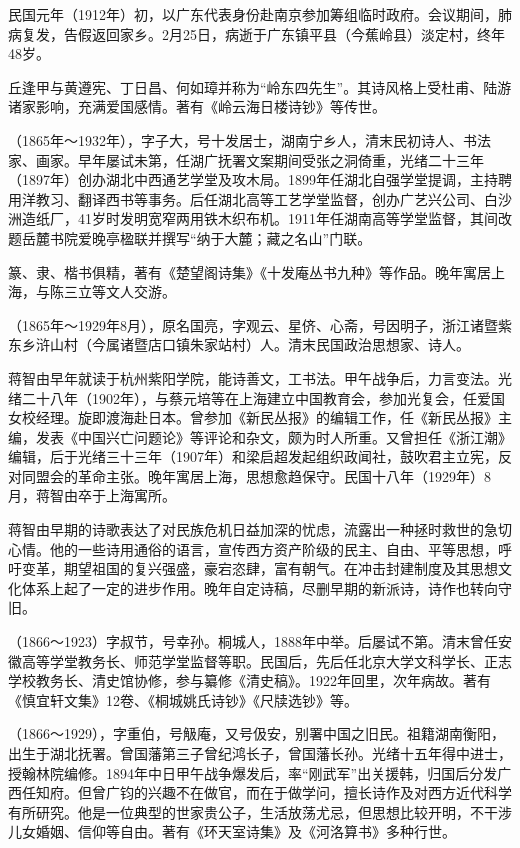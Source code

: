 \begin{description}
        民国元年（1912年）初，以广东代表身份赴南京参加筹组临时政府。会议期间，肺病复发，告假返回家乡。2月25日，病逝于广东镇平县（今蕉岭县）淡定村，终年48岁。\par
        丘逢甲与黄遵宪、丁日昌、何如璋并称为“岭东四先生”。其诗风格上受杜甫、陆游诸家影响，充满爱国感情。著有《岭云海日楼诗钞》等传世。
  \item[程颂万] （1865年～1932年），字子大，号十发居士，湖南宁乡人，清末民初诗人、书法家、画家。早年屡试未第，任湖广抚署文案期间受张之洞倚重，光绪二十三年（1897年）创办湖北中西通艺学堂及攻木局。1899年任湖北自强学堂提调，主持聘用洋教习、翻译西书等事务。后任湖北高等工艺学堂监督，创办广艺兴公司、白沙洲造纸厂，41岁时发明宽窄两用铁木织布机。1911年任湖南高等学堂监督，其间改题岳麓书院爱晚亭楹联并撰写“纳于大麓；藏之名山”门联。\par
        篆、隶、楷书俱精，著有《楚望阁诗集》《十发庵丛书九种》等作品。晚年寓居上海，与陈三立等文人交游。
  \item[蒋智由] （1865年～1929年8月），原名国亮，字观云、星侪、心斋，号因明子，浙江诸暨紫东乡浒山村（今属诸暨店口镇朱家站村）人。清末民国政治思想家、诗人。\par
        蒋智由早年就读于杭州紫阳学院，能诗善文，工书法。甲午战争后，力言变法。光绪二十八年（1902年），与蔡元培等在上海建立中国教育会，参加光复会，任爱国女校经理。旋即渡海赴日本。曾参加《新民丛报》的编辑工作，任《新民丛报》主编，发表《中国兴亡问题论》等评论和杂文，颇为时人所重。又曾担任《浙江潮》编辑，后于光绪三十三年（1907年）和梁启超发起组织政闻社，鼓吹君主立宪，反对同盟会的革命主张。晚年寓居上海，思想愈趋保守。民国十八年（1929年）8月，蒋智由卒于上海寓所。\par
        蒋智由早期的诗歌表达了对民族危机日益加深的忧虑，流露出一种拯时救世的急切心情。他的一些诗用通俗的语言，宣传西方资产阶级的民主、自由、平等思想，呼吁变革，期望祖国的复兴强盛，豪宕恣肆，富有朝气。在冲击封建制度及其思想文化体系上起了一定的进步作用。晚年自定诗稿，尽删早期的新派诗，诗作也转向守旧。
  \item[姚永概] （1866～1923）字叔节，号幸孙。桐城人，1888年中举。后屡试不第。清末曾任安徽高等学堂教务长、师范学堂监督等职。民国后，先后任北京大学文科学长、正志学校教务长、清史馆协修，参与纂修《清史稿》。1922年回里，次年病故。著有《慎宜轩文集》12卷、《桐城姚氏诗钞》《尺牍选钞》等。
  \item[曾广钧] （1866～1929），字重伯，号觙庵，又号伋安，别署中国之旧民。祖籍湖南衡阳，出生于湖北抚署。曾国藩第三子曾纪鸿长子，曾国藩长孙。光绪十五年得中进士，授翰林院编修。1894年中日甲午战争爆发后，率“刚武军”出关援韩，归国后分发广西任知府。但曾广钧的兴趣不在做官，而在于做学问，擅长诗作及对西方近代科学有所研究。他是一位典型的世家贵公子，生活放荡尤忌，但思想比较开明，不干涉儿女婚姻、信仰等自由。著有《环天室诗集》及《河洛算书》多种行世。\par

\end{description}
